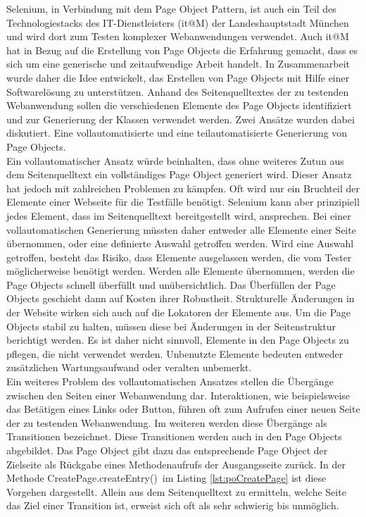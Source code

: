 Selenium, in Verbindung mit dem Page Object Pattern, ist auch ein Teil des Technologiestacks des IT-Dienstleisters (it@M) der Landeshauptstadt München und wird dort zum Testen komplexer Webanwendungen verwendet. Auch it@M hat in Bezug auf die Erstellung von Page Objects die Erfahrung gemacht, dass es sich um eine generische und zeitaufwendige Arbeit handelt.
In Zusammenarbeit wurde daher die Idee entwickelt, das Erstellen von Page Objects mit Hilfe einer Softwarelösung zu unterstützen.
Anhand des Seitenquelltextes der zu testenden Webanwendung sollen die verschiedenen Elemente des Page Objects identifiziert und zur Generierung der Klassen verwendet werden.
Zwei Ansätze wurden dabei diskutiert. Eine vollautomatisierte und eine teilautomatisierte Generierung von Page Objects.\\
Ein vollautomatischer Ansatz würde beinhalten, dass ohne weiteres Zutun aus dem Seitenquelltext ein vollständiges Page Object generiert wird. Dieser Ansatz hat jedoch mit zahlreichen Problemen zu kämpfen. Oft wird nur ein Bruchteil der Elemente einer Webseite für die Testfälle benötigt. Selenium kann aber prinzipiell jedes Element, dass im Seitenquelltext bereitgestellt wird, ansprechen. Bei einer vollautomatischen Generierung müssten daher entweder alle Elemente einer Seite übernommen, oder eine definierte Auswahl getroffen werden.
Wird eine Auswahl getroffen, besteht das Risiko, dass Elemente ausgelassen werden, die vom Tester möglicherweise benötigt werden. Werden alle Elemente übernommen, werden die Page Objects schnell überfüllt und unübersichtlich. Das Überfüllen der Page Objects geschieht dann auf Kosten ihrer Robustheit. Strukturelle Änderungen in der Website wirken sich auch auf die Lokatoren der Elemente aus. Um die Page Objects stabil zu halten, müssen diese bei Änderungen in der Seitenstruktur berichtigt werden.
Es ist daher nicht sinnvoll, Elemente in den Page Objects zu pflegen, die nicht verwendet werden. Unbenutzte Elemente bedeuten entweder zusätzlichen Wartungsaufwand oder veralten unbemerkt.\\
Ein weiteres Problem des vollautomatischen Ansatzes stellen die Übergänge zwischen den Seiten einer Webanwendung dar. Interaktionen, wie beispielsweise das Betätigen eines Links oder Button, führen oft zum Aufrufen einer neuen Seite der zu testenden Webanwendung. Im weiteren werden diese Übergänge als Transitionen bezeichnet. Diese Transitionen werden auch in den Page Objects abgebildet. Das Page Object gibt dazu das entsprechende Page Object der Zielseite als Rückgabe eines Methodenaufrufs der Ausgangsseite zurück. In der Methode \grq CreatePage.createEntry()\grq\ im Listing \ref{lst:poCreatePage} ist diese Vorgehen dargestellt. Allein aus dem Seitenquelltext zu ermitteln, welche Seite das Ziel einer Transition ist, erweist sich oft als sehr schwierig bis unmöglich.\\

